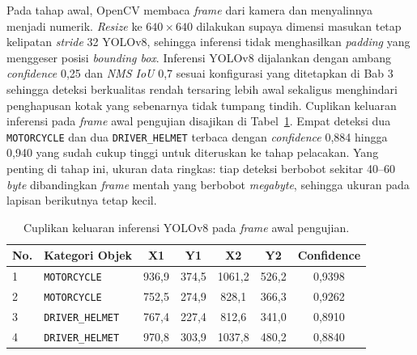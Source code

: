 Pada tahap awal, OpenCV membaca \textit{frame} dari kamera dan menyalinnya menjadi numerik. \textit{Resize} ke $640 \times 640$ dilakukan supaya dimensi masukan tetap kelipatan \textit{stride} 32 YOLOv8, sehingga inferensi tidak menghasilkan \textit{padding} yang menggeser posisi \textit{bounding box}. Inferensi YOLOv8 dijalankan dengan ambang \textit{confidence} 0,25 dan \textit{NMS IoU} 0,7 sesuai konfigurasi yang ditetapkan di Bab 3 sehingga deteksi berkualitas rendah tersaring lebih awal sekaligus menghindari penghapusan kotak yang sebenarnya tidak tumpang tindih. Cuplikan keluaran inferensi pada \textit{frame} awal pengujian disajikan di Tabel~\ref{tab:output-yolo}. Empat deteksi  dua \texttt{MOTORCYCLE} dan dua \texttt{DRIVER\_HELMET}  terbaca dengan \textit{confidence} 0,884 hingga 0,940 yang sudah cukup tinggi untuk diteruskan ke tahap pelacakan. Yang penting di tahap ini, ukuran data ringkas: tiap deteksi berbobot sekitar 40--60 \textit{byte} dibandingkan \textit{frame} mentah yang berbobot \textit{megabyte}, sehingga ukuran pada lapisan berikutnya tetap kecil.

\begin{table}[htbp]
\centering
\caption{Cuplikan keluaran inferensi YOLOv8 pada \textit{frame} awal pengujian.}
\label{tab:output-yolo}
\footnotesize
\setlength{\tabcolsep}{3pt}
\begin{tabular}{p{1.4cm} p{3.2cm} c c c c c}
\toprule
\textbf{No.} & \textbf{Kategori Objek} & \textbf{X1} & \textbf{Y1} & \textbf{X2} & \textbf{Y2} & \textbf{Confidence} \\
\midrule
1 & \texttt{MOTORCYCLE}      & 936{,}9  & 374{,}5 & 1061{,}2 & 526{,}2 & 0{,}9398 \\
2 & \texttt{MOTORCYCLE}      & 752{,}5  & 274{,}9 &  828{,}1 & 366{,}3 & 0{,}9262 \\
3 & \texttt{DRIVER\_HELMET}  & 767{,}4  & 227{,}4 &  812{,}6 & 341{,}0 & 0{,}8910 \\
4 & \texttt{DRIVER\_HELMET}  & 970{,}8  & 303{,}9 & 1037{,}8 & 480{,}2 & 0{,}8840 \\
\bottomrule
\end{tabular}
\end{table}

